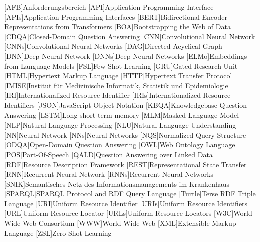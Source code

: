 \begin{acronym}[nogroupskip]
\setlength{\parskip}{0ex}
\setlength{\itemsep}{1.5ex}
[AFB]{Anforderungsbereich}
[API]{Application Programming Interface}
[APIs]{Application Programming Interfaces}
[BERT]{Bidirectional Encoder Representations from Transformers}
[BOA]{Bootstrapping the Web of Data}
[CDQA]{Closed-Domain Question Answering}
[CNN]{Convolutional Neural Network}
[CNNs]{Convolutional Neural Networks}
[DAG]{Directed Acyclical Graph}
[DNN]{Deep Neural Network}
[DNNs]{Deep Neural Networks}
[ELMo]{Embeddings from Language Models}
[FSL]{Few-Shot Learning}
[GRU]{Gated Research Unit}
[HTML]{Hypertext Markup Language}
[HTTP]{Hypertext Transfer Protocol}
[IMISE]{Institut für Medizinische Informatik, Statistik und Epidemiologie}
[IRI]{Internationalized Resource Identifier}
[IRIs]{Internationalized Resource Identifiers}
[JSON]{JavaScript Object Notation}
[KBQA]{Knowledgebase Question Answering}
[LSTM]{Long short-term memory}
[MLM]{Masked Language Model}
[NLP]{Natural Language Processing}
[NLU]{Natural Language Understanding}
[NN]{Neural Network}
[NNs]{Neural Networks}
[NQS]{Normalized Query Structure}
[ODQA]{Open-Domain Question Answering}
[OWL]{Web Ontology Language}
[POS]{Part-Of-Speech}
[QALD]{Question Answering over Linked Data}
[RDF]{Resource Description Framework}
[REST]{Representational State Transfer}
[RNN]{Recurrent Neural Network}
[RNNs]{Recurrent Neural Networks}
[SNIK]{Semantisches Netz des Informationsmanagements im Krankenhaus}
[SPARQL]{SPARQL Protocol and RDF Query Language}
[Turtle]{Terse RDF Triple Language}
[URI]{Uniform Resource Identifier}
[URIs]{Uniform Resource Identifiers}
[URL]{Uniform Resource Locator}
[URLs]{Uniform Resource Locators}
[W3C]{World Wide Web Consortium}
[WWW]{World Wide Web}
[XML]{Extensible Markup Language}
[ZSL]{Zero-Shot Learning}
\end{acronym}
